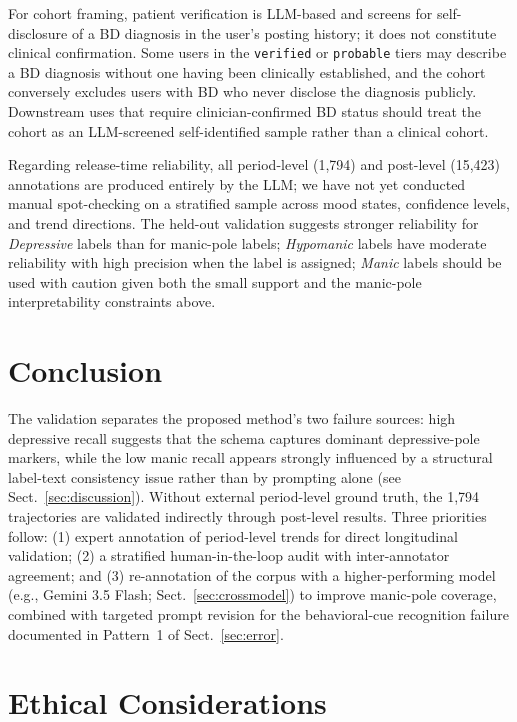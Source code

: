 \documentclass[runningheads]{llncs}
\begin{document}
For cohort framing, patient verification is LLM-based and screens for self-disclosure of a BD diagnosis in the user's posting history; it does not constitute clinical confirmation. Some users in the \texttt{verified} or \texttt{probable} tiers may describe a BD diagnosis without one having been clinically established, and the cohort conversely excludes users with BD who never disclose the diagnosis publicly. Downstream uses that require clinician-confirmed BD status should treat the cohort as an LLM-screened self-identified sample rather than a clinical cohort.

Regarding release-time reliability, all period-level (1,794) and post-level (15,423) annotations are produced entirely by the LLM; we have not yet conducted manual spot-checking on a stratified sample across mood states, confidence levels, and trend directions. The held-out validation suggests stronger reliability for \emph{Depressive} labels than for manic-pole labels; \emph{Hypomanic} labels have moderate reliability with high precision when the label is assigned; \emph{Manic} labels should be used with caution given both the small support and the manic-pole interpretability constraints above.

\section{Conclusion}

The validation separates the proposed method's two failure sources: high depressive recall suggests that the schema captures dominant depressive-pole markers, while the low manic recall appears strongly influenced by a structural label-text consistency issue rather than by prompting alone (see Sect.~\ref{sec:discussion}). Without external period-level ground truth, the 1,794 trajectories are validated indirectly through post-level results. Three priorities follow: (1) expert annotation of period-level trends for direct longitudinal validation; (2) a stratified human-in-the-loop audit with inter-annotator agreement; and (3) re-annotation of the corpus with a higher-performing model (e.g., Gemini 3.5 Flash; Sect.~\ref{sec:crossmodel}) to improve manic-pole coverage, combined with targeted prompt revision for the behavioral-cue recognition failure documented in Pattern~1 of Sect.~\ref{sec:error}.

\section{Ethical Considerations}
\label{sec:ethics}
\end{document}
